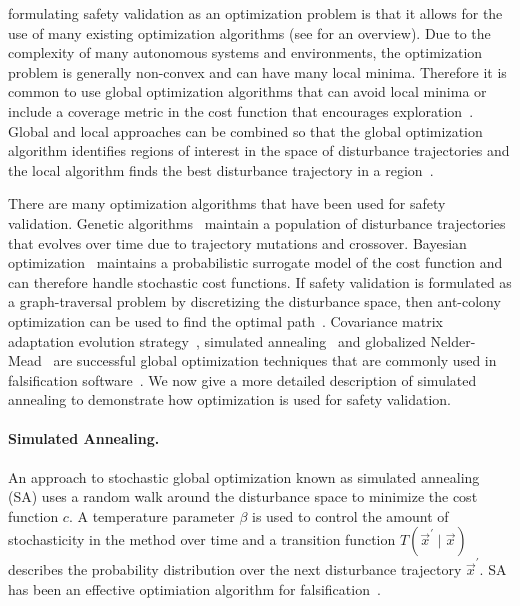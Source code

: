 formulating safety validation as an optimization problem is that it allows for the use of many existing optimization algorithms (see \textcite{kochenderfer2019algorithms} for an overview). Due to the complexity of many autonomous systems and environments, the optimization problem is generally non-convex and can have many local minima. Therefore it is common to use global optimization algorithms that can avoid local minima or include a coverage metric in the cost function that encourages exploration~\cite{esposito2004adaptive,Nahhal2007Test,dokhanchi2015requirements}. Global and local approaches can be combined so that the global optimization algorithm identifies regions of interest in the space of disturbance trajectories and the local algorithm finds the best disturbance trajectory in a region~\cite{deshmukh2015stochastic,adimoolam2017classification, yaghoubi2019gray,Mathesen2019falsification}.

There are many optimization algorithms that have been used for safety validation. Genetic algorithms~\cite{zhao2003generating,zou2014safety} maintain a population of disturbance trajectories that evolves over time due to trajectory mutations and crossover. Bayesian optimization~\cite{akazaki2017causality, silvetti2017active, Deshmukh2017testing, mullins2018adaptive, abeysirigoonawardena2019generating,yang2020stress} maintains a probabilistic surrogate model of the cost function and can therefore handle stochastic cost functions. If safety validation is formulated as a graph-traversal problem by discretizing the disturbance space, then ant-colony optimization can be used to find the optimal path~\cite{annapureddy2010ant}. Covariance matrix adaptation evolution strategy~\cite{hansen1996adapting}, simulated annealing~\cite{abbas2013probabilistic} and globalized Nelder-Mead~\cite{luersen2004globalized} are successful global optimization techniques that are commonly used in falsification software~\cite{annapureddy2011staliro,donze2010breach}. We now give a more detailed description of simulated annealing to demonstrate how optimization is used for safety validation.

\paragraph{Simulated Annealing.} An approach to stochastic global optimization known as simulated annealing (SA) uses a random walk around the disturbance space to minimize the cost function $c$. A temperature parameter $\beta$ is used to control the amount of stochasticity in the method over time and a transition function $T(\vec{x}^\prime \mid \vec{x})$ describes the probability distribution over the next disturbance trajectory $\vec{x}^\prime$. SA has been an effective optimiation algorithm for falsification~\cite{abbas2013probabilistic,aerts2018temporal}.

